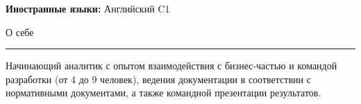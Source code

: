 \documentclass[14pt, a4paper, oneside]{extarticle}
\begin{document}
\textbf{Иностранные языки:} Английский C1


\begin{flushleft}
	\vspace{-\intextsep}
	\large О себе
\end{flushleft}

\vspace{-0.8\intextsep}
\hrule

\begin{sloppypar}
	\vspace{0.5\intextsep}
	\quad
	Начинающий аналитик с опытом взаимодействия с бизнес-частью и командой разработки (от 4 до 9 человек), ведения документации в соответствии с нормативными документами, а также командной презентации результатов.
\end{sloppypar}
\end{document}
